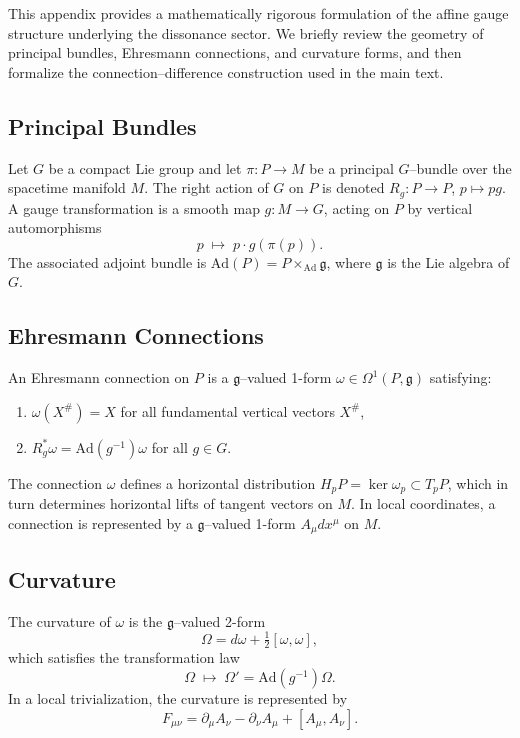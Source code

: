 \documentclass[12pt,openany]{book}
\theoremstyle{plain}
\theoremstyle{definition}
\theoremstyle{remark}
\begin{document}
This appendix provides a mathematically rigorous formulation of the affine
gauge structure underlying the dissonance sector. We briefly review the
geometry of principal bundles, Ehresmann connections, and curvature forms,
and then formalize the connection--difference construction used in the main
text.

\subsection*{Principal Bundles}

Let $G$ be a compact Lie group and let $\pi : P \to M$ be a principal
$G$--bundle over the spacetime manifold $M$. The right action of $G$ on $P$
is denoted $R_g : P \to P$, $p \mapsto p g$. A gauge transformation is a
smooth map $g : M \to G$, acting on $P$ by vertical automorphisms
\[
p \;\mapsto\; p \cdot g(\pi(p)).
\]
The associated adjoint bundle is $\mathrm{Ad}(P) = P \times_{\mathrm{Ad}} \mathfrak{g}$,
where $\mathfrak{g}$ is the Lie algebra of $G$.

\subsection*{Ehresmann Connections}

An Ehresmann connection on $P$ is a $\mathfrak{g}$--valued 1-form
$\omega \in \Omega^1(P,\mathfrak{g})$ satisfying:

\begin{enumerate}
    \item $\omega(X^\#) = X$ for all fundamental vertical vectors $X^\#$,
    \item $R_g^* \omega = \mathrm{Ad}(g^{-1}) \omega$ for all $g \in G$.
\end{enumerate}

The connection $\omega$ defines a horizontal distribution
$H_p P = \ker \omega_p \subset T_p P$, which in turn determines horizontal
lifts of tangent vectors on $M$. In local coordinates, a connection is
represented by a $\mathfrak{g}$--valued 1-form $A_\mu dx^\mu$ on $M$.

\subsection*{Curvature}

The curvature of $\omega$ is the $\mathfrak{g}$--valued 2-form
\[
\Omega = d\omega + \tfrac{1}{2}[\omega,\omega],
\]
which satisfies the transformation law
\[
\Omega \;\mapsto\; \Omega' = \mathrm{Ad}(g^{-1}) \Omega.
\]
In a local trivialization, the curvature is represented by
\[
F_{\mu\nu}
= \partial_\mu A_\nu - \partial_\nu A_\mu + [A_\mu, A_\nu].
\]
\end{document}
